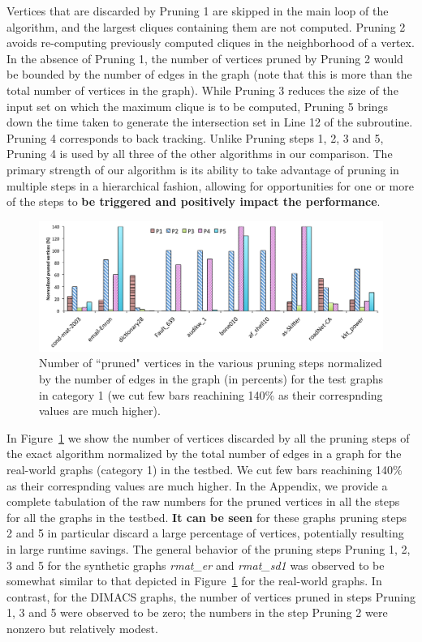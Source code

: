 Vertices that are discarded by Pruning 1 are skipped in the main loop of the algorithm, and the largest cliques containing them are not computed. Pruning 2 avoids re-computing previously computed cliques in the neighborhood of a vertex. In the absence of Pruning 1, the number of vertices pruned by Pruning 2 would be bounded by the number of edges in the graph (note that this is more than the total number of vertices in the graph). While Pruning 3 reduces the size of the input set on which the maximum clique is to be computed, Pruning 5 brings down the time taken to generate the intersection set in Line 12 of the subroutine. 
Pruning 4 corresponds to back tracking. Unlike Pruning steps 1, 2, 3 and 5, Pruning 4
is used  by all three of the other algorithms in our comparison. The primary strength of our algorithm is its ability to take advantage of pruning in multiple steps in a hierarchical fashion, allowing for opportunities for one or more of the steps to {\bf be triggered and positively impact the performance}.

\begin{figure}
  \centering
    \includegraphics[scale=0.5]{pruned.pdf}
\caption{Number of ``pruned" vertices in the various pruning steps normalized
by the number of edges in the graph (in percents) for the test graphs in category 1 (we cut few bars reachining 140\% as their correspnding values are much higher).}
\label{fig-pruningplot}
\end{figure}


In Figure~\ref{fig-pruningplot} we show the number of vertices discarded by all
the  pruning steps of the exact algorithm normalized by the total number of edges
in a graph for the real-world graphs (category 1) in the testbed. We cut few bars reachining
140\% as their correspnding values are much higher.
In the Appendix, we provide a complete tabulation of the raw numbers for the pruned vertices in all the steps for all the graphs in the testbed. {\bf It can be seen} for these graphs pruning steps 2 and 5 in particular discard a large percentage of vertices, potentially resulting in large runtime savings. The general behavior of the pruning steps Pruning 1, 2, 3 and 5 for the synthetic graphs {\em rmat\_er} and {\em rmat\_sd1} was observed to be somewhat similar to that depicted in Figure~\ref{fig-pruningplot} for the real-world graphs. In contrast, for the DIMACS graphs, the number of vertices pruned in steps Pruning 1, 3 and 5 were observed to be zero; the numbers in the step Pruning 2 were nonzero but relatively modest.


